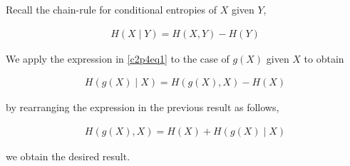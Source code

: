 \documentclass[ClusteringConnectionsMAIN.tex]{subfiles}
\begin{document}
	
	
  Recall the chain-rule for conditional entropies of $X$ given $Y$,

\begin{align}  \label{c2p4eq1}
H \left( X \mid Y \right) = H \left( X, Y \right) - H \left( Y \right)  \tag{2.4-1}
\end{align}

\newpage

We apply the expression in \ref{c2p4eq1} to the case of $g \left( X \right)$ given $X$ to obtain

\begin{align} 
H \left( g \left( X \right) \mid X \right) = H \left( g \left( X \right), X \right) - H \left( X \right) 
\end{align}

by rearranging the expression in the previous result as follows,

\begin{align} \label{c2p4eq2} 
H \left( g \left( X \right), X \right) = H \left( X \right) + H \left( g \left( X \right) \mid X \right)  \tag{2.4-2}
\end{align}

we obtain the desired result.
\end{document}
